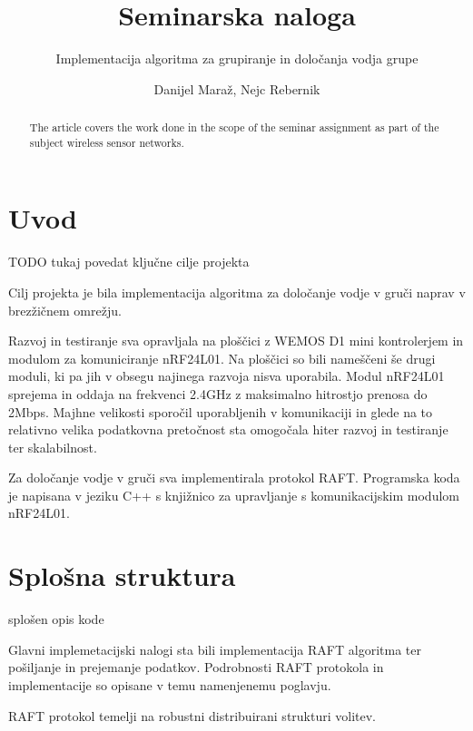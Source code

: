\documentclass[runningheads]{llncs}
\begin{document}
\title{Seminarska naloga}
\subtitle{Implementacija algoritma za grupiranje in določanja vodja grupe}

\author{Danijel Maraž, Nejc Rebernik}


\maketitle             

\begin{abstract}
The article covers the work done in the scope of the seminar assignment as part of the subject wireless sensor networks.

\end{abstract}

\section{Uvod}
TODO tukaj povedat ključne cilje projekta 

Cilj projekta je bila implementacija algoritma za določanje vodje v gruči naprav v brezžičnem omrežju.

Razvoj in testiranje sva opravljala na ploščici z WEMOS D1 mini kontrolerjem in modulom za komuniciranje nRF24L01. Na ploščici so bili nameščeni še drugi moduli, ki pa jih v obsegu najinega razvoja nisva uporabila. Modul nRF24L01 sprejema in oddaja na frekvenci 2.4GHz z maksimalno hitrostjo prenosa do 2Mbps. Majhne velikosti sporočil uporabljenih v komunikaciji in glede na to relativno velika podatkovna pretočnost sta omogočala hiter razvoj in testiranje ter skalabilnost.

Za določanje vodje v gruči sva implementirala protokol RAFT. Programska koda je napisana v jeziku C++ s knjižnico za upravljanje s komunikacijskim modulom nRF24L01.

\section{Splošna struktura}
splošen opis kode

Glavni implemetacijski nalogi sta bili implementacija RAFT algoritma ter pošiljanje in prejemanje podatkov. Podrobnosti RAFT protokola in implementacije so opisane v temu namenjenemu poglavju. 

RAFT protokol temelji na robustni distribuirani strukturi volitev.
\end{document}
